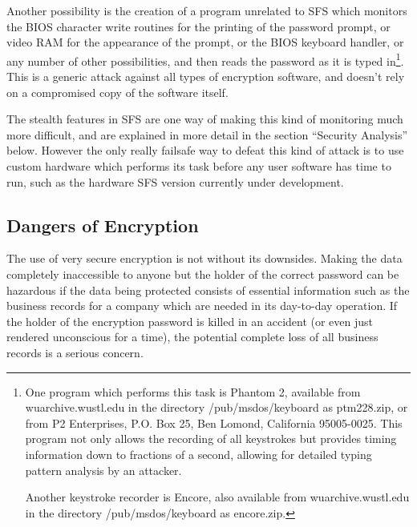 Another possibility is the creation of a program unrelated to SFS which
monitors the BIOS character write routines for the printing of the password
prompt, or video RAM for the appearance of the prompt, or the BIOS keyboard
handler, or any number of other possibilities, and then reads the password as
it is typed in\footnote{
		One program which performs this task is Phantom 2, available from
              	wuarchive.wustl.edu in the directory /pub/msdos/keyboard as
              	ptm228.zip, or from P2 Enterprises, P.O. Box 25, Ben Lomond,
              	California 95005-0025.  This program not only allows the
              	recording of all keystrokes but provides timing information down
              	to fractions of a second, allowing for detailed typing pattern
              	analysis by an attacker.

              Another keystroke recorder is Encore, also available from
              wuarchive.wustl.edu in the directory /pub/msdos/keyboard as
              encore.zip.
}.  This is a generic attack against all types of encryption
software, and doesn't rely on a compromised copy of the software itself.  

The stealth features in SFS are one way of making this kind of monitoring much
more difficult, and are explained in more detail in the section ``Security
Analysis'' below.  However the only really failsafe way to defeat this kind of
attack is to use custom hardware which performs its task before any user
software has time to run, such as the hardware SFS version currently under
development.



\subsection{Dangers of Encryption}

The use of very secure encryption is not without its downsides.  Making the 
data completely inaccessible to anyone but the holder of the correct password 
can be hazardous if the data being protected consists of essential information 
such as the business records for a company which are needed in its day-to-day 
operation.  If the holder of the encryption password is killed in an accident 
(or even just rendered unconscious for a time), the potential complete loss of 
all business records is a serious concern.

